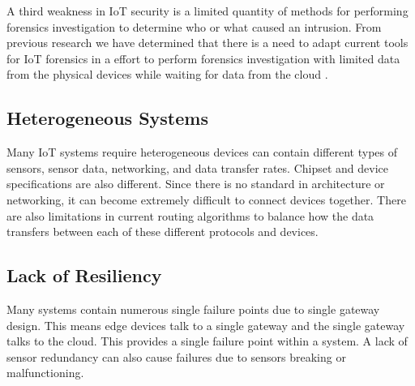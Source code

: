 \documentclass[../main.tex]{subfiles}
\begin{document}
A third weakness in IoT security is a limited quantity of methods for performing forensics investigation to determine who or what caused an intrusion. From previous research we have determined that there is a need to adapt current tools for IoT forensics in a effort to perform forensics investigation with limited data from the physical devices while waiting for data from the cloud \cite{DBLP:conf/colcom/OriwohJES13}. 

\subsection{Heterogeneous Systems}
Many IoT systems require heterogeneous devices can contain different types of sensors, sensor data, networking, and data transfer rates. Chipset and device specifications are also different. Since there is no standard in architecture or networking, it can become extremely difficult to connect devices together. There are also limitations in current routing algorithms to balance how the data transfers between each of these different protocols and devices.

\subsection{Lack of Resiliency}

Many systems contain numerous single failure points due to single gateway design. This means edge devices talk to a single gateway and the single gateway talks to the cloud. This provides a single failure point within a system. A lack of sensor redundancy can also cause failures due to sensors breaking or malfunctioning. 
\end{document}
